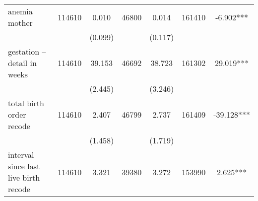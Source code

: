 \begin{tabular}{@{\extracolsep{5pt}}lcccccc}
anemia mother   & 114610    & 0.010    & 46800    & 0.014    & 161410    & -6.902***   \\                                                                                                                                                                                                                                                                                                      
 &   & (0.099)  &   & (0.117)  &   &  \\ [1ex]                                                                                                                                                                                                                                                                                                                                                 
gestation -- detail in weeks   & 114610    & 39.153    & 46692    & 38.723    & 161302    & 29.019***   \\                                                                                                                                                                                                                                                                                     
 &   & (2.445)  &   & (3.246)  &   &  \\ [1ex]                                                                                                                                                                                                                                                                                                                                                 
total birth order recode   & 114610    & 2.407    & 46799    & 2.737    & 161409    & -39.128***   \\                                                                                                                                                                                                                                                                                          
 &   & (1.458)  &   & (1.719)  &   &  \\ [1ex]                                                                                                                                                                                                                                                                                                                                                 
interval since last live birth recode   & 114610    & 3.321    & 39380    & 3.272    & 153990    & 2.625***   \\                                                                                                                                                                                                                                                                               

\end{tabular}
